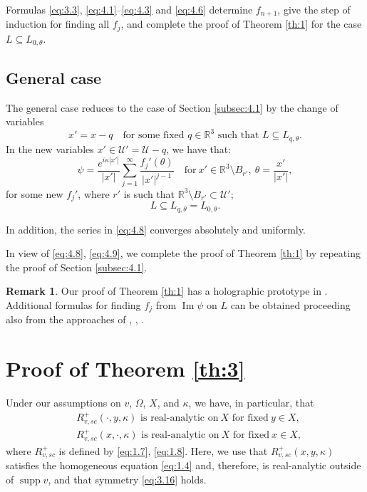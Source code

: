 \documentclass[JEP,XML,SOM,Unicode,NoEqCountersInSection,published]{cedram}
\DeclareMathOperator{\supp}{supp}
\newcommand{\RR}{\mathbb R}
\renewcommand{\Im}{\mathop{\mathrm{Im}}}
\theoremstyle{definition}
\newtheorem{remark}{Remark}
\begin{document}
Formulas \eqref{eq:3.3}, \eqref{eq:4.1}--\eqref{eq:4.3} and \eqref{eq:4.6} determine $f_{n+1}$, give the step of induction for finding all $f_j$, and complete the proof of Theorem \ref{th:1} for the case $L\subseteq L_{0, \theta}$.

\subsection{General case}
The general case reduces to the case of Section \ref{subsec:4.1} by the change of variables
\begin{equation}
x'=x-q \label{eq:4.7}\quad
\text{for some fixed $q\in\RR^3$ such that $L\subseteq L_{q, \theta}$.}
\end{equation}
In the new variables $x'\in\mathcal{U}'=\mathcal{U}-q$, we have that:
\begin{equation}
\label{eq:4.8}
\psi= \frac{e^{i\kappa|x'|}}{|x'|}\sum\limits_{j=1}^{\infty}\frac{f_j'(\theta)}{|x'|^{j-1}} \quad \text{for}\ x'\in \RR^3\setminus B_{r'}, \ \theta=\frac{x'}{|x'|},
\end{equation}
for some new $f_j'$,
where $r'$ is such that $\RR^3\setminus B_{r'} \subset \mathcal{U}'$;
\begin{equation}
\label{eq:4.9}
L\subseteq L_{q, \theta}=L_{0, \theta}.
\end{equation}

In addition, the series in \eqref{eq:4.8} converges absolutely and uniformly.

In view of \eqref{eq:4.8}, \eqref{eq:4.9},
we complete the proof of Theorem \ref{th:1} by repeating the proof of Section \ref{subsec:4.1}.

\begin{remark}\label{rem:6}
Our proof of Theorem \ref{th:1} has a holographic prototype in \cite{N5}.
Additional formulas for finding $f_j$ from $\Im\psi$ on $L$
can be obtained proceeding also from the approaches of \cite{N4}, \cite{NS2}, \cite{NSS}.
\end{remark}

\section{Proof of Theorem \ref{th:3}}\label{sec:5}

Under our assumptions on $v$, $\Omega$, $X$, and $\kappa$, we have, in particular, that
\begin{align}
&R_{v,sc}^+(\cdot, y, \kappa)\text{ is real-analytic on}\ X\text{ for fixed}\ y \in X, \label{eq:5.1a} \\
&R_{v,sc}^+(x, \cdot, \kappa)\text{ is real-analytic on}\ X\text{ for fixed}\ x \in X, \label{eq:5.1b}
\end{align}
where $R_{v,sc}^+$ is defined by \eqref{eq:1.7}, \eqref{eq:1.8}.
Here, we use that $R_{v,sc}^+(x, y, \kappa)$ satisfies the homogeneous equation \eqref{eq:1.4} and, therefore, is real-analytic outside of $\supp v$,
and that symmetry \eqref{eq:3.16} holds.
\end{document}
